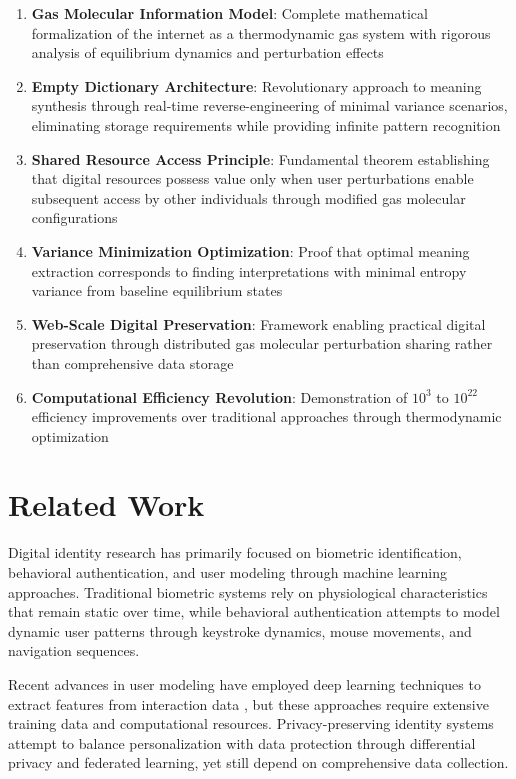 \documentclass[12pt,a4paper]{article}
\begin{document}
\begin{enumerate}
\item \textbf{Gas Molecular Information Model}: Complete mathematical formalization of the internet as a thermodynamic gas system with rigorous analysis of equilibrium dynamics and perturbation effects
\item \textbf{Empty Dictionary Architecture}: Revolutionary approach to meaning synthesis through real-time reverse-engineering of minimal variance scenarios, eliminating storage requirements while providing infinite pattern recognition
\item \textbf{Shared Resource Access Principle}: Fundamental theorem establishing that digital resources possess value only when user perturbations enable subsequent access by other individuals through modified gas molecular configurations
\item \textbf{Variance Minimization Optimization}: Proof that optimal meaning extraction corresponds to finding interpretations with minimal entropy variance from baseline equilibrium states
\item \textbf{Web-Scale Digital Preservation}: Framework enabling practical digital preservation through distributed gas molecular perturbation sharing rather than comprehensive data storage
\item \textbf{Computational Efficiency Revolution}: Demonstration of $10^3$ to $10^{22}$ efficiency improvements over traditional approaches through thermodynamic optimization
\end{enumerate}

\section{Related Work}

Digital identity research has primarily focused on biometric identification, behavioral authentication, and user modeling through machine learning approaches. Traditional biometric systems \cite{jain2007handbook} rely on physiological characteristics that remain static over time, while behavioral authentication \cite{yampolskiy2008behavioural} attempts to model dynamic user patterns through keystroke dynamics, mouse movements, and navigation sequences.

Recent advances in user modeling have employed deep learning techniques to extract features from interaction data \cite{shen2019comprehensive}, but these approaches require extensive training data and computational resources. Privacy-preserving identity systems \cite{wang2019survey} attempt to balance personalization with data protection through differential privacy and federated learning, yet still depend on comprehensive data collection.
\end{document}
